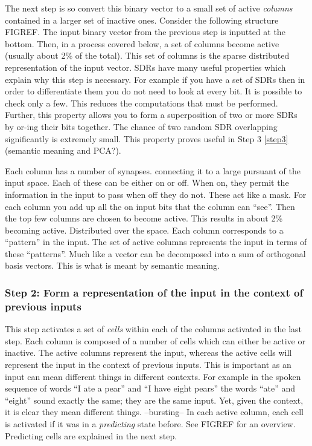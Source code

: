\documentclass[a4paper]{jpconf}
\begin{document}
			The next step is so convert this binary vector to a small set of active \emph{columns} contained in a larger set of inactive ones. Consider the following structure FIGREF. The input binary vector from the previous step is inputted at the bottom. Then, in a process covered below, a set of columns become active (usually about 2\% of the total). This set of columns is the sparse distributed representation of the input vector. SDRs have  many useful properties which explain why this step is necessary. For example if you have a set of SDRs then in order to differentiate them you do not need to look at every bit. It is possible to check only a few. This reduces the computations that must be performed. Further, this property allows you to form a superposition of two or more SDRs by or-ing their bits together. The chance of two random SDR overlapping significantly is extremely small. This property proves useful in Step 3 \ref{step3} (semantic meaning and PCA?). 
			
			Each column has a number of synapses. connecting it to  a large pursuant of the input space. Each of these can be either on or off. When on, they permit the information in the input to pass when off they do not. These act like a mask. For each column you add up all the on input bits that the column can ``see''. Then the top few columns are chosen to become active. This results in about 2\% becoming active. Distributed over the space. Each column corresponds to a ``pattern'' in the input. The set of active columns represents the input in terms of these ``patterns''. Much like a vector can be decomposed into a sum of orthogonal basis vectors. This is what is meant by semantic meaning.
			
		\subsubsection{Step 2: Form a representation of the input in the context of previous inputs}
			This step activates a set of \emph{cells} within each of the columns activated in the last step. Each column is composed of a number of cells which can either be active or inactive. The active columns represent the input, whereas the active cells will represent the input in the context of previous inputs. This is important as an input can mean different things in different contexts. For example in the spoken sequence of words ``I ate a pear'' and ``I have eight pears'' the words ``ate'' and ``eight'' sound exactly the same; they are the same input. Yet, given the context, it is clear they mean different things.
			--bursting--
			In each active column, each cell is activated if it was in a \emph{predicting} state before. See FIGREF for an overview. Predicting cells are explained in the next step.
\end{document}
